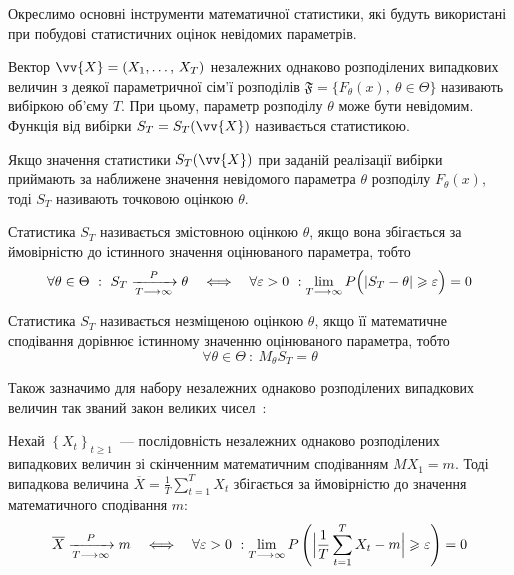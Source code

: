 Окреслимо основні інструменти математичної статистики, які будуть використані при побудові статистичних оцінок невідомих параметрів.

Вектор $\vv{X}=(X_1,\ldots,\,X_T)$ незалежних однаково розподілених випадкових величин з деякої параметричної сім'ї розподілів $\mathfrak{F}=\{ F_\theta(x),\ \theta \in \Theta \}$ називають вибіркою об'єму $T$. При цьому, параметр розподілу $\theta$ може бути невідомим. Функція від вибірки $S_T=S_T(\vv{X})$ називається статистикою. 

Якщо значення статистики $S_T(\vv{X})$ при заданій реалізації вибірки приймають за наближене значення невідомого параметра $\theta$ розподілу $F_\theta(x)$, тоді $S_T$ називають точковою оцінкою $\theta$. 

\begin{definition}
    Статистика $S_T$ називається змістовною оцінкою $\theta$, якщо вона збігається за ймовірністю до істинного значення оцінюваного параметра, тобто 
    \begin{equation*}
        \forall \theta \in \Theta\ :\ S_T \xrightarrow[T \longrightarrow \infty]{P} \theta \quad \Longleftrightarrow \quad \forall \varepsilon > 0\ : \lim\limits_{T \longrightarrow \infty} P\Bigl( \left|S_T - \theta\right| \geqslant \varepsilon \Bigr) = 0
    \end{equation*}
\end{definition}

\begin{definition}
    Статистика $S_T$ називається незміщеною оцінкою $\theta$, якщо її математичне сподівання дорівнює істинному значенню оцінюваного параметра, тобто
    \begin{equation*}
        \forall \theta \in \Theta\ :\ M_\theta S_T = \theta
    \end{equation*}
\end{definition}

Також зазначимо для набору незалежних однаково розподілених випадкових величин так званий закон великих чисел~\cite{Larsen2017}:

\begin{theorem}\label{theorem: law of big numbers}
    Нехай $\left\{ X_t \right\}_{t\geqslant 1}$~--- послідовність незалежних однаково розподілених випадкових величин зі скінченним математичним сподіванням $MX_1=m$. Тоді випадкова величина $\overline{X}=\frac{1}{T}\sum\limits_{t=1}^{T} X_t$ збігається за ймовірністю до значення математичного сподівання $m:$
    \begin{equation*}
        \overline{X} \xrightarrow[T \longrightarrow \infty]{P} m \quad \Longleftrightarrow \quad \forall \varepsilon > 0\ : \lim\limits_{T \longrightarrow \infty} P\left( \Bigl| \frac{1}{T}\sum\limits_{t=1}^{T} X_t - m \Bigr| \geqslant \varepsilon \right) = 0
    \end{equation*}
\end{theorem}

